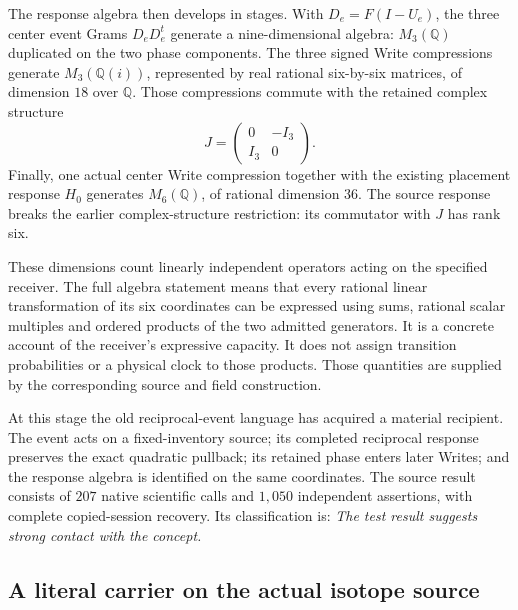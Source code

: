 The response algebra then develops in stages. With $D_e=F(I-U_e)$, the three center event Grams $D_eD_e^t$ generate a nine-dimensional algebra: $M_3(\mathbb Q)$ duplicated on the two phase components. The three signed Write compressions generate $M_3(\mathbb Q(i))$, represented by real rational six-by-six matrices, of dimension $18$ over $\mathbb Q$. Those compressions commute with the retained complex structure
\begin{equation}
 J=\begin{pmatrix}0&-I_3\\ I_3&0\end{pmatrix}.
\end{equation}
Finally, one actual center Write compression together with the existing placement response $H_0$ generates $M_6(\mathbb Q)$, of rational dimension $36$. The source response breaks the earlier complex-structure restriction: its commutator with $J$ has rank six.

These dimensions count linearly independent operators acting on the specified receiver. The full algebra statement means that every rational linear transformation of its six coordinates can be expressed using sums, rational scalar multiples and ordered products of the two admitted generators. It is a concrete account of the receiver's expressive capacity. It does not assign transition probabilities or a physical clock to those products. Those quantities are supplied by the corresponding source and field construction.

At this stage the old reciprocal-event language has acquired a material recipient. The event acts on a fixed-inventory source; its completed reciprocal response preserves the exact quadratic pullback; its retained phase enters later Writes; and the response algebra is identified on the same coordinates. The source result consists of $207$ native scientific calls and $1{,}050$ independent assertions, with complete copied-session recovery. Its classification is: \emph{The test result suggests strong contact with the concept.}

\subsection{A literal carrier on the actual isotope source}

